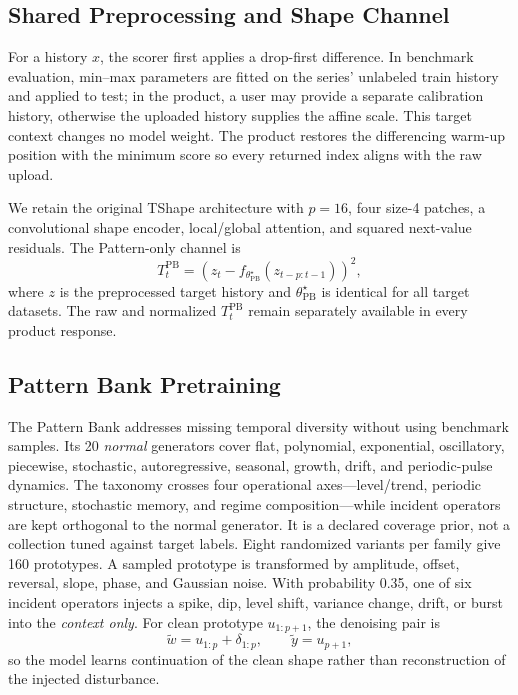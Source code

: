 \documentclass[conference]{IEEEtran}
\begin{document}
\subsection{Shared Preprocessing and Shape Channel}

For a history $x$, the scorer first applies a drop-first difference. In benchmark evaluation, min--max parameters are fitted on the series' unlabeled train history and applied to test; in the product, a user may provide a separate calibration history, otherwise the uploaded history supplies the affine scale. This target context changes no model weight. The product restores the differencing warm-up position with the minimum score so every returned index aligns with the raw upload.

We retain the original TShape architecture with $p=16$, four size-4 patches, a convolutional shape encoder, local/global attention, and squared next-value residuals. The Pattern-only channel is
\begin{equation}
 T_t^{\mathrm{PB}}=
 \left(z_t-f_{\theta^\star_{\mathrm{PB}}}(z_{t-p:t-1})\right)^2 ,
 \label{eq:pattern-score}
\end{equation}
where $z$ is the preprocessed target history and $\theta^\star_{\mathrm{PB}}$ is identical for all target datasets. The raw and normalized $T_t^{\mathrm{PB}}$ remain separately available in every product response.

\subsection{Pattern Bank Pretraining}

The Pattern Bank addresses missing temporal diversity without using benchmark samples. Its 20 \emph{normal} generators cover flat, polynomial, exponential, oscillatory, piecewise, stochastic, autoregressive, seasonal, growth, drift, and periodic-pulse dynamics. The taxonomy crosses four operational axes---level/trend, periodic structure, stochastic memory, and regime composition---while incident operators are kept orthogonal to the normal generator. It is a declared coverage prior, not a collection tuned against target labels. Eight randomized variants per family give 160 prototypes. A sampled prototype is transformed by amplitude, offset, reversal, slope, phase, and Gaussian noise. With probability 0.35, one of six incident operators injects a spike, dip, level shift, variance change, drift, or burst into the \emph{context only}. For clean prototype $u_{1:p+1}$, the denoising pair is
\begin{equation}
 \tilde w=u_{1:p}+\delta_{1:p},\qquad
 \tilde y=u_{p+1},
 \label{eq:pattern-pair}
\end{equation}
so the model learns continuation of the clean shape rather than reconstruction of the injected disturbance.
\end{document}
